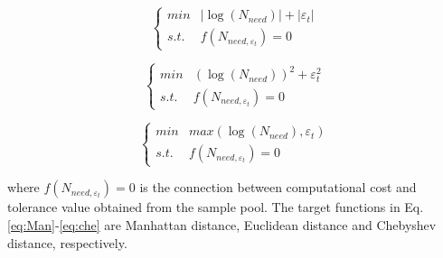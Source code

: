 \documentclass[review]{elsarticle}
\begin{document}
\begin{equation}
    \left\{\begin{array}{lr}
    min & |\log(N_{need})|+ |\varepsilon_t|\\
    s.t. & f(N_{need, \varepsilon_t})=0
  \end{array}
\right.
\label{eq:Man}
\end{equation}

\begin{equation}
    \left\{\begin{array}{lr}
    min & (\log(N_{need}))^2+ \varepsilon_t^2\\
    s.t. & f(N_{need, \varepsilon_t})=0
  \end{array}
\right.
\label{eq:Euc}
\end{equation}

\begin{equation}
    \left\{\begin{array}{lr}
    min & max(\log(N_{need}), \varepsilon_t)\\
    s.t. & f(N_{need, \varepsilon_t})=0
  \end{array}
\right.
\label{eq:che}
\end{equation}

\noindent where $f(N_{need, \varepsilon_t})=0$ is the connection between computational cost and tolerance value obtained from the sample pool. The target functions in Eq.\ref{eq:Man}-\ref{eq:che} are Manhattan distance, Euclidean distance and Chebyshev distance, respectively.
\end{document}
